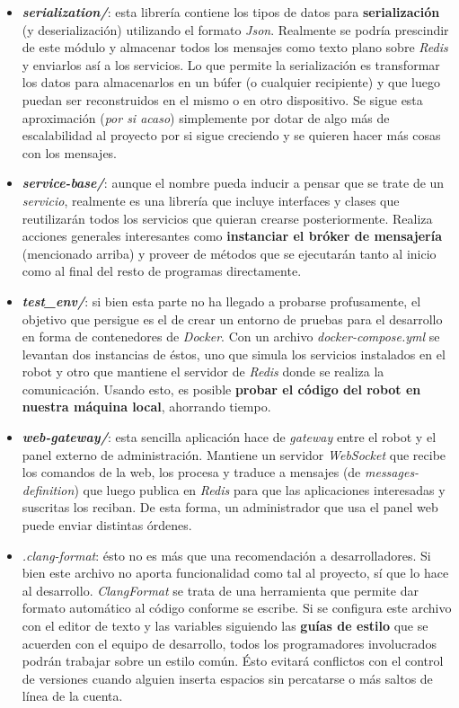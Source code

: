\begin{itemize}
	\item \textit{\textbf{serialization/}}: esta librería contiene los tipos de datos para \textbf{serialización} (y deserialización) utilizando el formato \textit{Json}. Realmente se podría prescindir de este módulo y almacenar todos los mensajes como texto plano sobre \textit{Redis} y enviarlos así a los servicios. Lo que permite la serialización es transformar los datos para almacenarlos en un búfer (o cualquier recipiente) y que luego puedan ser reconstruidos en el mismo o en otro dispositivo. Se sigue esta aproximación (\textit{por si acaso}) simplemente por dotar de algo más de escalabilidad al proyecto por si sigue creciendo y se quieren hacer más cosas con los mensajes.
	\item \textit{\textbf{service-base/}}: aunque el nombre pueda inducir a pensar que se trate de un \textit{servicio}, realmente es una librería que incluye interfaces y clases que reutilizarán todos los servicios que quieran crearse posteriormente. Realiza acciones generales interesantes como \textbf{instanciar el bróker de mensajería} (mencionado arriba) y proveer de métodos que se ejecutarán tanto al inicio como al final del resto de programas directamente.
	\item \textit{\textbf{test\_env/}}: si bien esta parte no ha llegado a probarse profusamente, el objetivo que persigue es el de crear un entorno de pruebas para el desarrollo en forma de contenedores de \textit{Docker}. Con un archivo \emph{docker-compose.yml} se levantan dos instancias de éstos, uno que simula los servicios instalados en el robot y otro que mantiene el servidor de \textit{Redis} donde se realiza la comunicación. Usando esto, es posible \textbf{probar el código del robot en nuestra máquina local}, ahorrando tiempo.
	\item \textit{\textbf{web-gateway/}}: esta sencilla aplicación hace de \textit{gateway} entre el robot y el panel externo de administración. Mantiene un servidor \textit{WebSocket} que recibe los comandos de la web, los procesa y traduce a mensajes (de \textit{messages-definition}) que luego publica en \textit{Redis} para que las aplicaciones interesadas y suscritas los reciban. De esta forma, un administrador que usa el panel web puede enviar distintas órdenes.
	\item \textit{.clang-format}: ésto no es más que una recomendación a desarrolladores. Si bien este archivo no aporta funcionalidad como tal al proyecto, sí que lo hace al desarrollo. \textit{ClangFormat} \cite{clang-format} se trata de una herramienta que permite dar formato automático al código conforme se escribe. Si se configura este archivo con el editor de texto y las variables siguiendo las \textbf{guías de estilo} que se acuerden con el equipo de desarrollo, todos los programadores involucrados podrán trabajar sobre un estilo común. Ésto evitará conflictos con el control de versiones cuando alguien inserta espacios sin percatarse o más saltos de línea de la cuenta.

\end{itemize}
